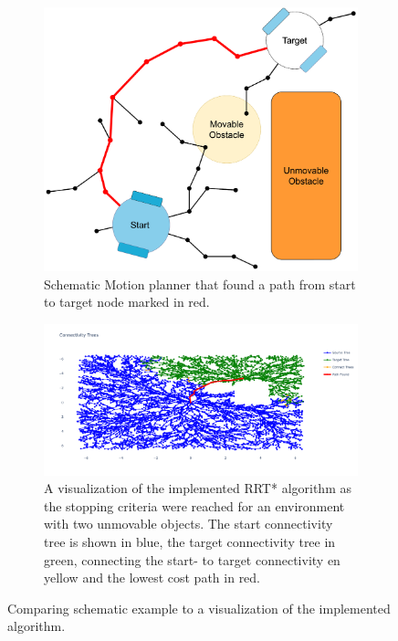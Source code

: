 \begin{figure}[H]
    \centering
    \begin{subfigure}{0.5\textwidth}
    \centering
    \includegraphics[width=1.10\textwidth]{figures/required_background/mp/7mp_path_found.drawio.png}
    \caption{Schematic Motion planner that found a path from start to target node marked in red.}
    \end{subfigure}%

    \begin{subfigure}{\textwidth}
    \hspace{-0.7cm}
    \includegraphics[width=1.1\textwidth]{figures/required_background/mp/mp_the_real_deal.png}
    \caption{A visualization of the implemented \acs{RRT*} algorithm as the stopping criteria were reached for an environment with two unmovable objects. The start connectivity tree is shown in blue, the target connectivity tree in green, connecting the start- to target connectivity en yellow and the lowest cost path in red.}
    \end{subfigure}
    \label{fig:motion_planner_comparison}%
    \caption{Comparing schematic example to a visualization of the implemented algorithm.}
\end{figure}

